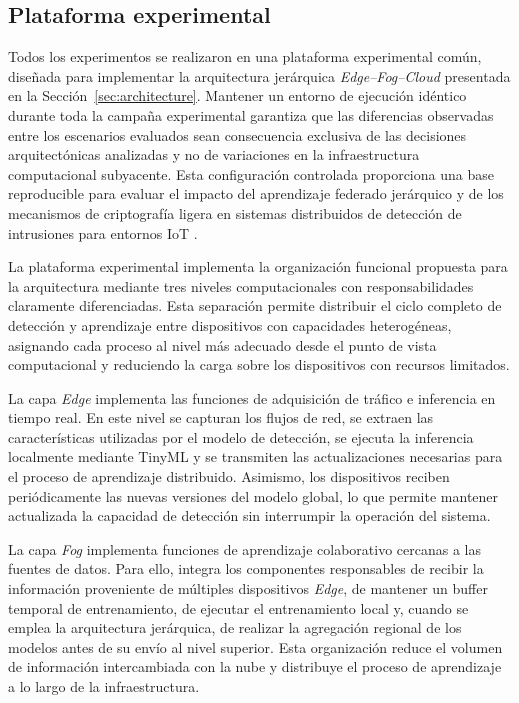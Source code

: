 \documentclass[journal,article,submit,moreauthors]{Definitions/mdpi}
\begin{document}
\subsection{Plataforma experimental}
Todos los experimentos se realizaron en una plataforma experimental común, diseñada para implementar la arquitectura jerárquica \textit{Edge--Fog--Cloud} presentada en la Sección~\ref{sec:architecture}. Mantener un entorno de ejecución idéntico durante toda la campaña experimental garantiza que las diferencias observadas entre los escenarios evaluados sean consecuencia exclusiva de las decisiones arquitectónicas analizadas y no de variaciones en la infraestructura computacional subyacente. Esta configuración controlada proporciona una base reproducible para evaluar el impacto del aprendizaje federado jerárquico y de los mecanismos de criptografía ligera en sistemas distribuidos de detección de intrusiones para entornos IoT \cite{Wang2019,SaravanaBalaji2023}.

La plataforma experimental implementa la organización funcional propuesta para la arquitectura mediante tres niveles computacionales con responsabilidades claramente diferenciadas. Esta separación permite distribuir el ciclo completo de detección y aprendizaje entre dispositivos con capacidades heterogéneas, asignando cada proceso al nivel más adecuado desde el punto de vista computacional y reduciendo la carga sobre los dispositivos con recursos limitados.

La capa \textit{Edge} implementa las funciones de adquisición de tráfico e inferencia en tiempo real. En este nivel se capturan los flujos de red, se extraen las características utilizadas por el modelo de detección, se ejecuta la inferencia localmente mediante TinyML y se transmiten las actualizaciones necesarias para el proceso de aprendizaje distribuido. Asimismo, los dispositivos reciben periódicamente las nuevas versiones del modelo global, lo que permite mantener actualizada la capacidad de detección sin interrumpir la operación del sistema.

La capa \textit{Fog} implementa funciones de aprendizaje colaborativo cercanas a las fuentes de datos. Para ello, integra los componentes responsables de recibir la información proveniente de múltiples dispositivos \textit{Edge}, de mantener un buffer temporal de entrenamiento, de ejecutar el entrenamiento local y, cuando se emplea la arquitectura jerárquica, de realizar la agregación regional de los modelos antes de su envío al nivel superior. Esta organización reduce el volumen de información intercambiada con la nube y distribuye el proceso de aprendizaje a lo largo de la infraestructura.
\end{document}
